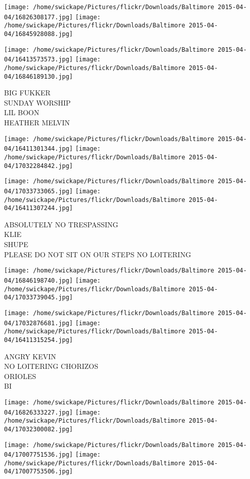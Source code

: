 \documentclass[10pt,letterpaper]{article}
\begin{document}
\texttt{[image: /home/swickape/Pictures/flickr/Downloads/Baltimore 2015-04-04/16826308177.jpg]}
\texttt{[image: /home/swickape/Pictures/flickr/Downloads/Baltimore 2015-04-04/16845928088.jpg]}

\texttt{[image: /home/swickape/Pictures/flickr/Downloads/Baltimore 2015-04-04/16413573573.jpg]}
\texttt{[image: /home/swickape/Pictures/flickr/Downloads/Baltimore 2015-04-04/16846189130.jpg]}

BIG FUKKER\\
SUNDAY WORSHIP\\
LIL BOON\\
HEATHER MELVIN
\pagebreak

\texttt{[image: /home/swickape/Pictures/flickr/Downloads/Baltimore 2015-04-04/16411301344.jpg]}
\texttt{[image: /home/swickape/Pictures/flickr/Downloads/Baltimore 2015-04-04/17032284842.jpg]}

\texttt{[image: /home/swickape/Pictures/flickr/Downloads/Baltimore 2015-04-04/17033733065.jpg]}
\texttt{[image: /home/swickape/Pictures/flickr/Downloads/Baltimore 2015-04-04/16411307244.jpg]}

ABSOLUTELY NO TRESPASSING\\
KLIE\\
SHUPE\\
PLEASE DO NOT SIT ON OUR STEPS NO LOITERING
\pagebreak

\texttt{[image: /home/swickape/Pictures/flickr/Downloads/Baltimore 2015-04-04/16846198740.jpg]}
\texttt{[image: /home/swickape/Pictures/flickr/Downloads/Baltimore 2015-04-04/17033739045.jpg]}

\texttt{[image: /home/swickape/Pictures/flickr/Downloads/Baltimore 2015-04-04/17032876681.jpg]}
\texttt{[image: /home/swickape/Pictures/flickr/Downloads/Baltimore 2015-04-04/16411315254.jpg]}

ANGRY KEVIN\\
NO LOITERING CHORIZOS\\
ORIOLES\\
BI
\pagebreak

\texttt{[image: /home/swickape/Pictures/flickr/Downloads/Baltimore 2015-04-04/16826333227.jpg]}
\texttt{[image: /home/swickape/Pictures/flickr/Downloads/Baltimore 2015-04-04/17032300082.jpg]}

\texttt{[image: /home/swickape/Pictures/flickr/Downloads/Baltimore 2015-04-04/17007751536.jpg]}
\texttt{[image: /home/swickape/Pictures/flickr/Downloads/Baltimore 2015-04-04/17007753506.jpg]}
\end{document}
